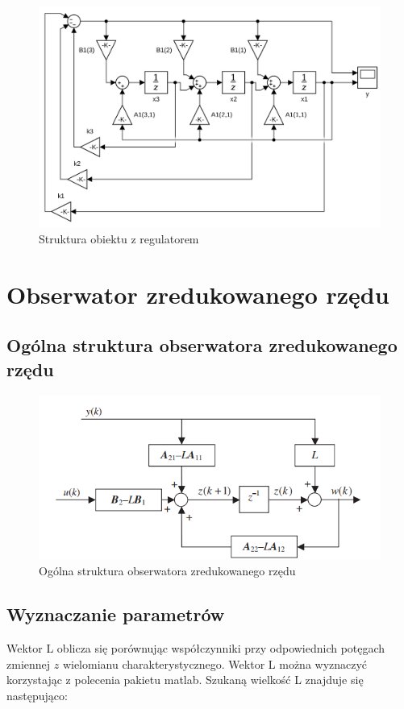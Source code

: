 \documentclass[a4paper, 11pt]{article}
\begin{document}
\begin{figure}[H]
\centering
\includegraphics[scale=0.3]{obiekt_regulator.png}
\caption{Struktura obiektu z regulatorem}
\end{figure}

\section{Obserwator zredukowanego rzędu}
\subsection{Ogólna struktura obserwatora zredukowanego rzędu}
\begin{figure}[H]
\centering
\includegraphics[scale=0.80]{obs.png}
\caption{Ogólna struktura obserwatora zredukowanego rzędu}
\label{}
\end{figure}

\subsection{Wyznaczanie parametrów}
Wektor L oblicza się porównując współczynniki przy odpowiednich potęgach zmiennej $z$
wielomianu charakterystycznego. Wektor L można wyznaczyć korzystając z polecenia pakietu matlab. Szukaną wielkość L znajduje się  następująco:\\
\end{document}

